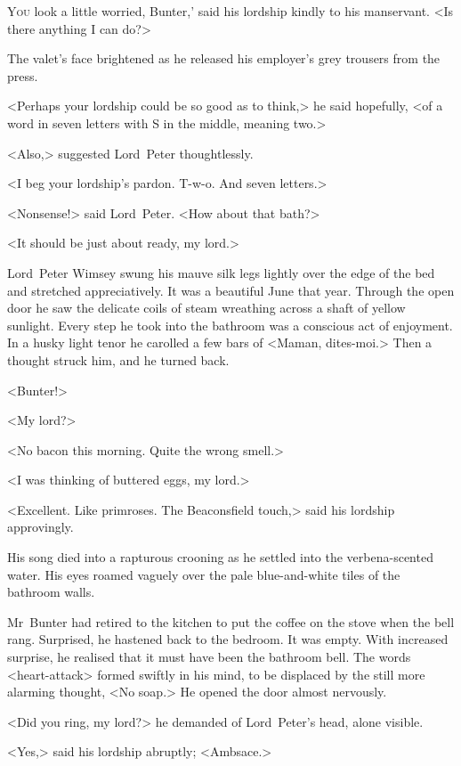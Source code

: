 
\lettrine[lines=4,ante=‘]{Y}{ou} look a little worried, Bunter,' said his lordship kindly to his manservant. <Is there anything I can do?>

\zz
The valet's face brightened as he released his employer's grey trousers from the press.

<Perhaps your lordship could be so good as to think,> he said hopefully, <of a word in seven letters with S in the middle, meaning two.>

<Also,> suggested Lord~Peter thoughtlessly.

<I beg your lordship's pardon. T-w-o. And seven letters.>

<Nonsense!> said Lord~Peter. <How about that bath?>

<It should be just about ready, my lord.>

Lord~Peter Wimsey swung his mauve silk legs lightly over the edge of the bed and stretched appreciatively. It was a beautiful June that year. Through the open door he saw the delicate coils of steam wreathing across a shaft of yellow sunlight. Every step he took into the bathroom was a conscious act of enjoyment. In a husky light tenor he carolled a few bars of <Maman, dites-moi.> Then a thought struck him, and he turned back.

<Bunter!>

<My lord?>

<No bacon this morning. Quite the wrong smell.>

<I was thinking of buttered eggs, my lord.>

<Excellent. Like primroses. The Beaconsfield touch,> said his lordship approvingly.

His song died into a rapturous crooning as he settled into the verbena-scented water. His eyes roamed vaguely over the pale blue-and-white tiles of the bathroom walls.

Mr~Bunter had retired to the kitchen to put the coffee on the stove when the bell rang. Surprised, he hastened back to the bedroom. It was empty. With increased surprise, he realised that it must have been the bathroom bell. The words <heart-attack> formed swiftly in his mind, to be displaced by the still more alarming thought, <No soap.> He opened the door almost nervously.

<Did you ring, my lord?> he demanded of Lord~Peter's head, alone visible.

<Yes,> said his lordship abruptly; <Ambsace.>

